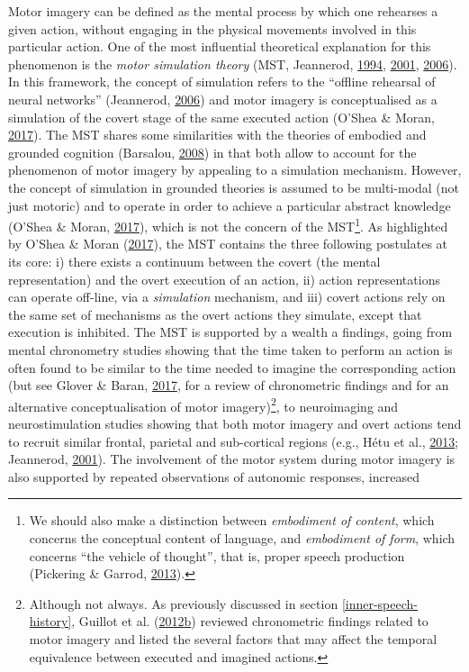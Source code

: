 \documentclass[a4paper,12pt,twoside,openright,oldfontcommands]{memoir}
\let\rmarkdownfootnote\footnote%
\def\footnote{\protect\rmarkdownfootnote}
\begin{document}
Motor imagery can be defined as the mental process by which one rehearses a given action, without engaging in the physical movements involved in this particular action. One of the most influential theoretical explanation for this phenomenon is the \emph{motor simulation theory} (MST, Jeannerod, \protect\hyperlink{ref-jeannerod_representing_1994}{1994}, \protect\hyperlink{ref-jeannerod_neural_2001}{2001}, \protect\hyperlink{ref-jeannerod_motor_2006}{2006}). In this framework, the concept of simulation refers to the \enquote{offline rehearsal of neural networks} (Jeannerod, \protect\hyperlink{ref-jeannerod_motor_2006}{2006}) and motor imagery is conceptualised as a simulation of the covert stage of the same executed action (O'Shea \& Moran, \protect\hyperlink{ref-oshea_does_2017}{2017}). The MST shares some similarities with the theories of embodied and grounded cognition (Barsalou, \protect\hyperlink{ref-Barsalou2008}{2008}) in that both allow to account for the phenomenon of motor imagery by appealing to a simulation mechanism. However, the concept of simulation in grounded theories is assumed to be multi-modal (not just motoric) and to operate in order to achieve a particular abstract knowledge (O'Shea \& Moran, \protect\hyperlink{ref-oshea_does_2017}{2017}), which is not the concern of the MST\footnote{We should also make a distinction between \emph{embodiment of content}, which concerns the conceptual content of language, and \emph{embodiment of form}, which concerns \enquote{the vehicle of thought}, that is, proper speech production (Pickering \& Garrod, \protect\hyperlink{ref-pickering_integrated_2013}{2013}).}. As highlighted by O'Shea \& Moran (\protect\hyperlink{ref-oshea_does_2017}{2017}), the MST contains the three following postulates at its core: i) there exists a continuum between the covert (the mental representation) and the overt execution of an action, ii) action representations can operate off-line, via a \emph{simulation} mechanism, and iii) covert actions rely on the same set of mechanisms as the overt actions they simulate, except that execution is inhibited. The MST is supported by a wealth a findings, going from mental chronometry studies showing that the time taken to perform an action is often found to be similar to the time needed to imagine the corresponding action (but see Glover \& Baran, \protect\hyperlink{ref-glover_motor-cognitive_2017}{2017}, for a review of chronometric findings and for an alternative conceptualisation of motor imagery)\footnote{Although not always. As previously discussed in section \ref{inner-speech-history}, Guillot et al. (\protect\hyperlink{ref-guillot_understanding_2012}{2012}\protect\hyperlink{ref-guillot_understanding_2012}{b}) reviewed chronometric findings related to motor imagery and listed the several factors that may affect the temporal equivalence between executed and imagined actions.}, to neuroimaging and neurostimulation studies showing that both motor imagery and overt actions tend to recruit similar frontal, parietal and sub-cortical regions (e.g., Hétu et al., \protect\hyperlink{ref-hetu_neural_2013}{2013}; Jeannerod, \protect\hyperlink{ref-jeannerod_neural_2001}{2001}). The involvement of the motor system during motor imagery is also supported by repeated observations of autonomic responses, increased 
\end{document}
